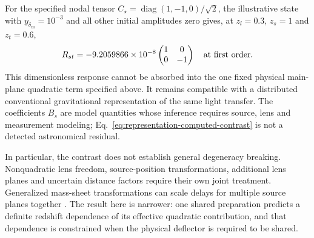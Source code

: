 For the specified nodal tensor
$C_\star=\operatorname{diag}(1,-1,0)/\sqrt2$, the illustrative state with
$y_{\delta_m}=10^{-3}$ and all other initial amplitudes zero gives, at
$z_l=0.3$, $z_s=1$ and $z_t=0.6$,
\begin{equation}
 R_{st}=
 -9.2059866\times10^{-8}
 \begin{pmatrix}1&0\\0&-1\end{pmatrix}
 \quad\hbox{at first order}.
 \label{eq:representation-computed-contrast}
\end{equation}
This dimensionless response cannot be absorbed into the one fixed physical
main-plane quadratic term specified above. It remains compatible with a
distributed conventional gravitational representation of the same light
transfer. The coefficients $B_s$ are model quantities whose inference requires
source, lens and measurement modeling; Eq.~\eqref{eq:representation-computed-contrast}
is not a detected astronomical residual.

In particular, the contrast does not establish general degeneracy breaking.
Nonquadratic lens freedom, source-position transformations, additional lens
planes and uncertain distance factors require their own joint treatment.
Generalized mass-sheet transformations can scale delays for multiple source
planes together \cite{Schneider2019Multiplane}. The result here is narrower:
one shared preparation predicts a definite redshift dependence of its
effective quadratic contribution, and that dependence is constrained when
the physical deflector is required to be shared.
